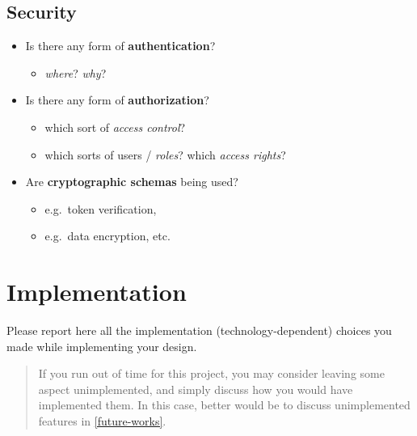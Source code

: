 \documentclass{scrartcl}
\begin{document}
\subsection{Security}\label{security}

\begin{itemize}
	\item Is there any form of \textbf{authentication}?
	\begin{itemize}
		\item \emph{where}? \emph{why}?
	\end{itemize}
	
	\item Is there any form of \textbf{authorization}?
	\begin{itemize}
		\item which sort of \emph{access control}?
		\item which sorts of users / \emph{roles}? which \emph{access rights}?
	\end{itemize}
	
	\item Are \textbf{cryptographic schemas} being used?
	\begin{itemize}
		\item e.g.~token verification,
		\item e.g.~data encryption, etc.
	\end{itemize}
\end{itemize}

\section{Implementation}\label{implementation}

Please report here all the implementation (technology-dependent) choices you made while implementing your design.

\begin{quote}
	If you run out of time for this project, you may consider leaving some aspect unimplemented, 
	and simply discuss how you would have implemented them.
	In this case, better would be to discuss unimplemented features in \cref{future-works}.
\end{quote}
\end{document}
